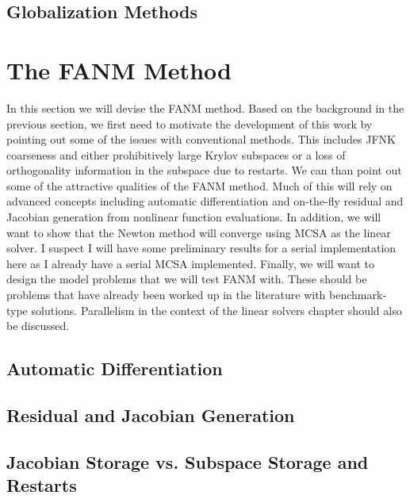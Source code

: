\subsection{Globalization Methods}
\label{subsec:globalization_methods}

\section{The FANM Method}
\label{sec:fanm}
In this section we will devise the FANM method. Based on the
background in the previous section, we first need to motivate the
development of this work by pointing out some of the issues with
conventional methods. This includes JFNK coarseness and either
prohibitively large Krylov subspaces or a loss of orthogonality
information in the subspace due to restarts. We can than point out
some of the attractive qualities of the FANM method. Much of this will
rely on advanced concepts including automatic differentiation and
on-the-fly residual and Jacobian generation from nonlinear function
evaluations. In addition, we will want to show that the Newton method
will converge using MCSA as the linear solver. I suspect I will have
some preliminary results for a serial implementation here as I already
have a serial MCSA implemented. Finally, we will want to design the
model problems that we will test FANM with. These should be problems
that have already been worked up in the literature with benchmark-type
solutions. Parallelism in the context of the linear solvers chapter
should also be discussed.

\subsection{Automatic Differentiation}
\label{sec:automatic_differentiation}

\subsection{Residual and Jacobian Generation}
\label{sec:fanm_generation}

\subsection{Jacobian Storage vs. Subspace Storage and Restarts}
\label{sec:fanm_storage}

